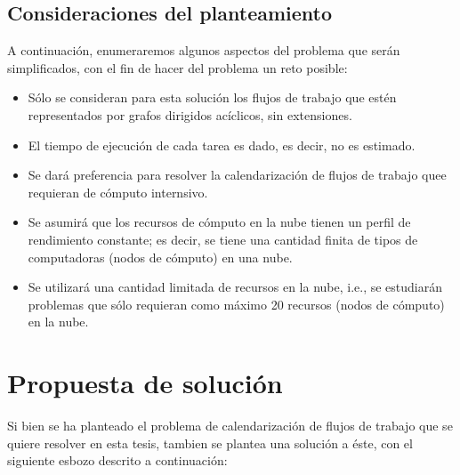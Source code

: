 \documentclass[letterpaper, 12pt]{report}
\begin{document}
\section*{Consideraciones del planteamiento}
A continuación, enumeraremos algunos aspectos del problema que serán simplificados, con el fin de hacer del problema un reto posible:

\begin{itemize}
\item Sólo se consideran para esta solución los flujos de trabajo que estén representados por grafos dirigidos acíclicos, sin extensiones.
\item El tiempo de ejecución de cada tarea es dado, es decir, no es estimado.
\item Se dará preferencia para resolver la calendarización de flujos de trabajo quee requieran de cómputo internsivo.
\item Se asumirá que los recursos de cómputo en la nube tienen un perfil de rendimiento constante; es decir, se tiene una cantidad finita de tipos de computadoras (nodos de cómputo) en una nube.
\item Se utilizará una cantidad limitada de recursos en la nube, i.e., se estudiarán problemas que sólo requieran como máximo 20 recursos (nodos de cómputo) en la nube.
\end{itemize}

\chapter*{Propuesta de solución}
Si bien se ha planteado el problema de calendarización de flujos de trabajo que se quiere resolver en esta tesis, tambien se plantea una solución a éste, con el siguiente esbozo descrito a continuación:
\end{document}
